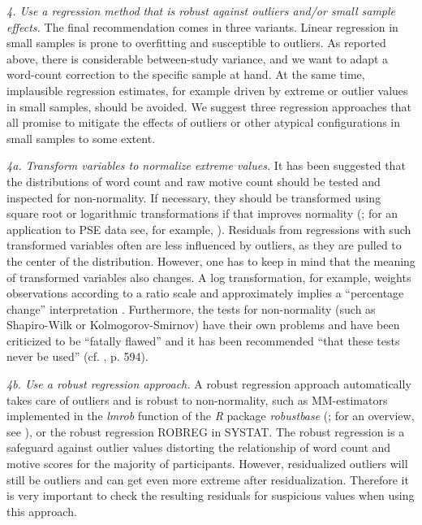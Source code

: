 \documentclass[man,a4paper,mask]{apa6}\usepackage[]{graphicx}\usepackage[]{color}
\begin{document}
\emph{4. Use a regression method that is robust against outliers and/or small sample effects.}
The final recommendation comes in three variants. Linear regression in small samples is prone to overfitting and susceptible to outliers. As reported above, there is considerable between-study variance, and we want to adapt a word-count correction to the specific sample at hand. At the same time, implausible regression estimates, for example driven by extreme or outlier values in small samples, should be avoided. We suggest three regression approaches that all promise to mitigate the effects of outliers or other atypical configurations in small samples to some extent.

\emph{4a. Transform variables to normalize extreme values.} It has been suggested that the distributions of word count and raw motive count should be tested and inspected for non-normality. If necessary, they should be transformed using square root or logarithmic transformations if that improves normality (; for an application to PSE data see, for example, ). Residuals from regressions with such transformed variables often are less influenced by outliers, as they are pulled to the center of the distribution. However, one has to keep in mind that the meaning of transformed variables also changes. A log transformation, for example, weights observations according to a ratio scale and approximately implies a ``percentage change'' interpretation \parencite{keene_LogTransformationSpecial_1995}. Furthermore, the tests for non-normality (such as Shapiro-Wilk or Kolmogorov-Smirnov) have their own problems and have been criticized to be ``fatally flawed'' and it has been recommended ``that these tests never be used'' (cf. , p. 594).

\emph{4b. Use a robust regression approach.}
A robust regression approach automatically takes care of outliers and is robust to non-normality, such as MM-estimators implemented in the \emph{lmrob} function of the \emph{R} package \emph{robustbase} (; for an overview, see ), or the robust regression ROBREG in SYSTAT. The robust regression is a safeguard against outlier values distorting the relationship of word count and motive scores for the majority of participants. However, residualized outliers will still be outliers and can get even more extreme after residualization. Therefore it is very important to check the resulting residuals for suspicious values when using this approach.
\end{document}

